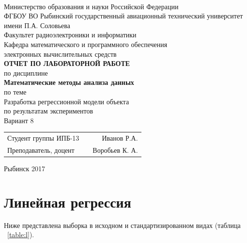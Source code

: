 \documentclass[a4paper,12pt]{article}
\begin{document}
\begin{titlepage}
\newpage

\

\begin{center}
	\large		
   	Министерство образования и науки Российской Федерации\\[0.5cm]
    	
	ФГБОУ ВО Рыбинский государственный авиационный технический университет имени П.А. Соловьева\\[1.0cm]

	Факультет радиоэлектроники и информатики\\[0.25cm]
		
	Кафедра математического и программного обеспечения\\ электронных вычислительных средств\\[1.5cm]

	\Large
	\textbf{\textsc{ОТЧЕТ ПО ЛАБОРАТОРНОЙ РАБОТЕ}}\\[0.25cm]
	по  дисциплине\\
	\textbf{Математические методы анализа данных}\\[0.5cm]
	
	по теме\\
	Разработка регрессионной модели объекта\\ по результатам экспериментов\\ Вариант 8\\
\end{center}

\vfill	
\begin{tabularx}{0.95\textwidth}{lXr}
Студент группы ИПБ-13 & &	Иванов Р.А.\\
Преподаватель, доцент & &	Воробьев К. А.
\end{tabularx}

\vfill 
\center Рыбинск 2017
\end{titlepage}	

\tableofcontents
\setcounter{page}{2}


\newpage\section{Линейная регрессия}

Ниже представлена выборка в исходном и стандартизированном видах (таблица ~\ref{table:l}).
\end{document}
